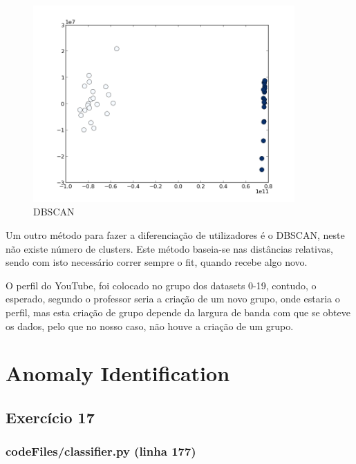 \documentclass[pdftex,12pt,a4paper]{report}
\begin{document}
\begin{figure}[!htb]
\center
 \includegraphics[width=100mm,scale=1]{classifier/DBSCAN.png}
 \caption{DBSCAN}
 \label{fig:dbscan}
\end{figure}

Um outro método para fazer a diferenciação de utilizadores é o DBSCAN, neste não existe número de clusters. Este método baseia-se nas distâncias relativas, sendo com isto necessário correr sempre o fit, quando recebe algo novo.

O perfil do YouTube, foi colocado no grupo dos datasets 0-19, contudo, o esperado, segundo o professor seria a criação de um novo grupo, onde estaria o perfil, mas esta criação de grupo depende da largura de banda com que se obteve os dados, pelo que no nosso caso, não houve a criação de um grupo.

\newpage
\section{Anomaly Identification}
\subsection{Exercício 17}
\subsubsection{codeFiles/classifier.py (linha 177)}
\end{document}
